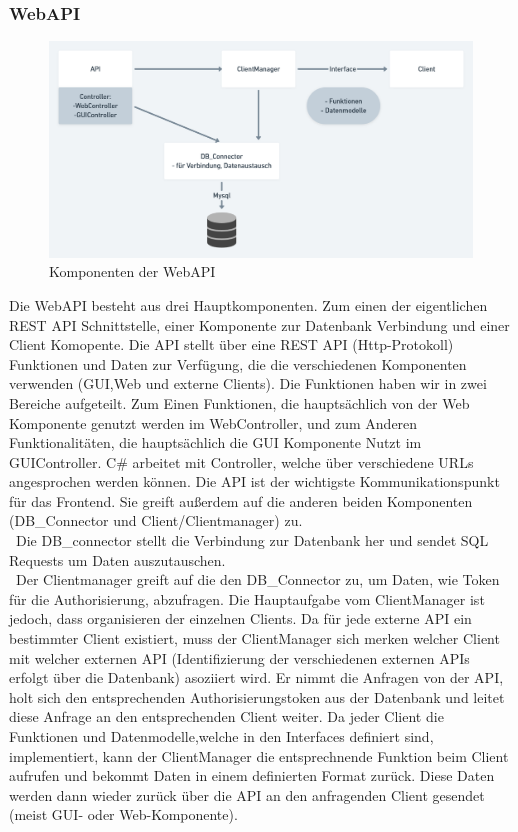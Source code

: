\subsubsection{WebAPI}
\begin{figure}[h]
\centering
\includegraphics[width=120mm]{pictures/WebAPI.png}
\caption{Komponenten der WebAPI}
\end{figure}
Die WebAPI besteht aus drei Hauptkomponenten. Zum einen der eigentlichen REST API Schnittstelle, einer Komponente zur Datenbank Verbindung und einer Client Komopente. Die API stellt über eine REST API (Http-Protokoll) Funktionen und Daten zur Verfügung, die die verschiedenen Komponenten verwenden (GUI,Web und externe Clients). Die Funktionen haben wir in zwei Bereiche aufgeteilt. Zum Einen Funktionen, die hauptsächlich von der Web Komponente genutzt werden im WebController, und zum Anderen Funktionalitäten, die hauptsächlich die GUI Komponente Nutzt im GUIController. C\# arbeitet mit Controller, welche über verschiedene URLs angesprochen werden können. Die API ist der wichtigste Kommunikationspunkt für das Frontend. Sie greift außerdem auf die anderen beiden Komponenten (DB\_Connector und Client/Clientmanager) zu.\\\
Die DB\_connector stellt die Verbindung zur Datenbank her und sendet SQL Requests um Daten auszutauschen.\\\
Der Clientmanager greift auf die den DB\_Connector zu, um Daten, wie Token für die Authorisierung, abzufragen. Die Hauptaufgabe vom ClientManager ist jedoch, dass organisieren der einzelnen Clients. Da für jede externe API ein bestimmter Client existiert, muss der ClientManager sich merken welcher Client mit welcher externen API (Identifizierung der verschiedenen externen APIs erfolgt über die Datenbank) asoziiert wird. Er nimmt die Anfragen von der API, holt sich den entsprechenden Authorisierungstoken aus der Datenbank und leitet diese Anfrage an den entsprechenden Client weiter. Da jeder Client die Funktionen und Datenmodelle,welche in den Interfaces definiert sind, implementiert, kann der ClientManager die entsprechnende Funktion beim Client aufrufen und bekommt Daten in einem definierten Format zurück. Diese Daten werden dann wieder zurück über die API an den anfragenden Client gesendet (meist GUI- oder Web-Komponente).


